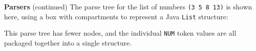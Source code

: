 \begin{minipage}[t]{\sw}
\slidenumber
\LARGE
{\bf Parsers} (continued)\exx
\Large
\emm\LightBox{\MYlonGrammarKleene}\exx
\LARGE
The parse tree for the list of numbers \verb'(3 5 8 13)' is shown here,
using a box with compartments to represent a Java \verb'List' structure:\exx
\centerline{}\exx
This parse tree has fewer nodes,
and the individual \verb'NUM' token values
are all packaged together into a single structure.
\end{minipage}
\clearpage
